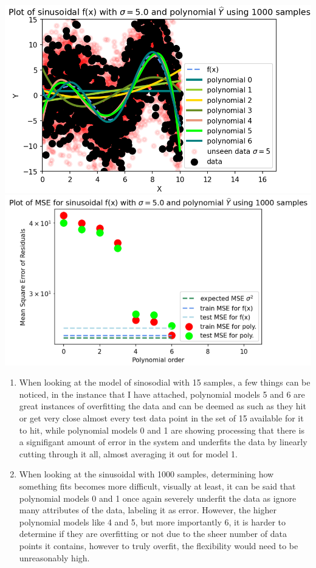 \documentclass[12pt]{article}
\begin{document}
\begin{enumerate}[label=(\alph*)]
\begin{center}
              \includegraphics[width=1\textwidth]{sinosodial-1000.png}
              \includegraphics[width=1\textwidth]{sinosodial-MSE-1000.png}
          \end{center}
          \begin{enumerate}[label=(\roman*)]
              \item When looking at the model of sinosodial with 15 samples, a few things can be noticed, in the instance that I have attached, polynomial models 5 and 6 are great instances of overfitting the data and can be deemed as such as they hit or get very close almost every test data point in the set of 15 available for it to hit, while polynomial models 0 and 1 are showing processing that there is a signifigant amount of error in the system and underfits the data by linearly cutting through it all, almost averaging it out for model 1.
              \item When looking at the sinusoidal with 1000 samples, determining how something fits becomes more difficult, visually at least, it can be said that polynomial models 0 and 1 once again severely underfit the data as ignore many attributes of the data, labeling it as error. However, the higher polynomial models like 4 and 5, but more importantly 6, it is harder to determine if they are overfitting or not due to the sheer number of data points it contains, however to truly overfit, the flexibility would need to be unreasonably high.

\end{enumerate}
\end{enumerate}
\end{document}
